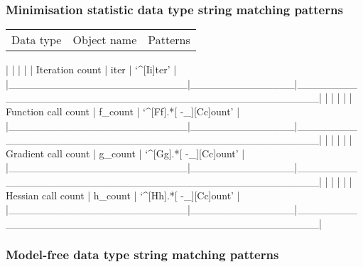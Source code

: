 \subsubsection{Minimisation statistic data type string matching patterns}



\begin{tabular}{ccc}
Data type & Object name & Patterns \\
\end{tabular}
|                        |              |                                                  |
| Iteration count        | iter         | `\^{}[Ii]ter'                                       |
|\_\_\_\_\_\_\_\_\_\_\_\_\_\_\_\_\_\_\_\_\_\_\_\_|\_\_\_\_\_\_\_\_\_\_\_\_\_\_|\_\_\_\_\_\_\_\_\_\_\_\_\_\_\_\_\_\_\_\_\_\_\_\_\_\_\_\_\_\_\_\_\_\_\_\_\_\_\_\_\_\_\_\_\_\_\_\_\_\_|
|                        |              |                                                  |
| Function call count    | f\_count      | `\^{}[Ff].*[ -\_][Cc]ount'                           |
|\_\_\_\_\_\_\_\_\_\_\_\_\_\_\_\_\_\_\_\_\_\_\_\_|\_\_\_\_\_\_\_\_\_\_\_\_\_\_|\_\_\_\_\_\_\_\_\_\_\_\_\_\_\_\_\_\_\_\_\_\_\_\_\_\_\_\_\_\_\_\_\_\_\_\_\_\_\_\_\_\_\_\_\_\_\_\_\_\_|
|                        |              |                                                  |
| Gradient call count    | g\_count      | `\^{}[Gg].*[ -\_][Cc]ount'                           |
|\_\_\_\_\_\_\_\_\_\_\_\_\_\_\_\_\_\_\_\_\_\_\_\_|\_\_\_\_\_\_\_\_\_\_\_\_\_\_|\_\_\_\_\_\_\_\_\_\_\_\_\_\_\_\_\_\_\_\_\_\_\_\_\_\_\_\_\_\_\_\_\_\_\_\_\_\_\_\_\_\_\_\_\_\_\_\_\_\_|
|                        |              |                                                  |
| Hessian call count     | h\_count      | `\^{}[Hh].*[ -\_][Cc]ount'                           |
|\_\_\_\_\_\_\_\_\_\_\_\_\_\_\_\_\_\_\_\_\_\_\_\_|\_\_\_\_\_\_\_\_\_\_\_\_\_\_|\_\_\_\_\_\_\_\_\_\_\_\_\_\_\_\_\_\_\_\_\_\_\_\_\_\_\_\_\_\_\_\_\_\_\_\_\_\_\_\_\_\_\_\_\_\_\_\_\_\_|




\subsubsection{Model-free data type string matching patterns}




